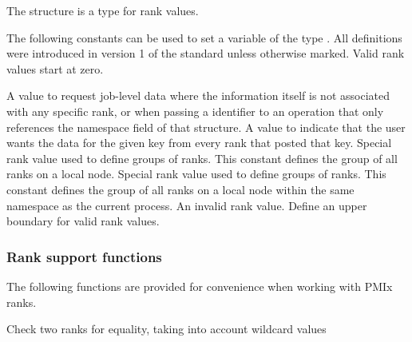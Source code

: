 The  structure is a  type for rank values.


The following constants can be used to set a variable of the type . All definitions were introduced in version 1 of the standard unless otherwise marked. Valid rank values start at zero.

\begin{constantdesc}
%
A value to request job-level data where the information itself is not associated with any specific rank, or when passing a  identifier to an operation that only references the namespace field of that structure.
%
A value to indicate that the user wants the data for the given key from every rank that posted that key.
%
Special rank value used to define groups of ranks.
This constant defines the group of all ranks on a local node.
%
Special rank value used to define groups of ranks.
This constant defines the group of all ranks on a local node within the same namespace as the current process.
%
An invalid rank value.
%
Define an upper boundary for valid rank values.
%
\end{constantdesc}


\subsubsection{Rank support functions}

The following functions are provided for convenience when working with \ac{PMIx} ranks.


Check two ranks for equality, taking into account wildcard values


\begin{arglist}
\end{arglist}

